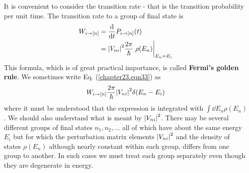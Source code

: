 It is convenient to consider the transition rate - that is the transition probability per unit time. The transition rate to a group of final state is
\begin{align}
W_{i \rightarrow [n]} &= \dv{}{t} P_{i \rightarrow [n]}(t) \nonumber\\
&= \abs{V_{n i}}^2 \frac{2\pi}{\hbar} \eval{\rho(E_n)}_{E_n=E_i}
\label{chapter23.eqn33}
\end{align}
This formula, which is of great practical importance, is called \textbf{Fermi's golden rule}. We sometimes write Eq. (\ref{chapter23.eqn33}) as
\begin{equation}
\label{chapter23.eqn34}
W_{i \rightarrow [n]} \frac{2 \pi}{\hbar} \abs{V_{n i}}^2 \delta(E_n - E_i)
\end{equation}
where it must be understood that the expression is integrated with $\int \dd{E_n} \rho(E_n)$.
We should also understand what is meant by $\abs{V_{n i}}^2$. There may be several different groups of final states $n_1, n_2, \ldots$ all of which have about the same energy $E_i$ but for which the perturbation matrix elements $\abs{V_{n i}}^2$ and the density of states $\rho(E_n)$ although nearly constant within each group, differs from one group to another. In such cases we must treat each group separately even though they are degenerate in energy.


